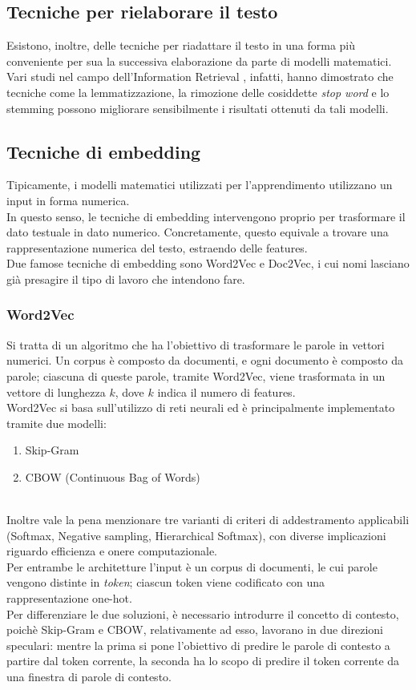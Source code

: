\documentclass[12pt]{report}
\theoremstyle{definition}
\begin{document}
\subsection{Tecniche per rielaborare il testo}
Esistono, inoltre, delle tecniche per riadattare il testo in una forma più conveniente per sua la successiva elaborazione da parte di modelli matematici.
\\
Vari studi nel campo dell'Information Retrieval \cite{22}, infatti, hanno dimostrato che tecniche come la lemmatizzazione, la rimozione delle cosiddette \textit{stop word} e lo stemming possono migliorare sensibilmente i risultati ottenuti da tali modelli.

\subsection{Tecniche di embedding} \label{embedding}
Tipicamente, i modelli matematici utilizzati per l'apprendimento utilizzano un input in forma numerica.
\\
In questo senso, le tecniche di embedding intervengono proprio per trasformare il dato testuale in dato numerico.
Concretamente, questo equivale a trovare una rappresentazione numerica del testo, estraendo delle features.
\\
Due famose tecniche di embedding sono Word2Vec e Doc2Vec, i cui nomi lasciano già presagire il tipo di lavoro che intendono fare.
\subsubsection{Word2Vec} \label{w2v}
Si tratta di un algoritmo che ha l'obiettivo di trasformare le parole in vettori numerici.
Un corpus è composto da documenti, e ogni documento è composto da parole; ciascuna di queste parole, tramite Word2Vec, viene trasformata in un vettore di lunghezza $k$, dove $k$ indica il numero di features. 
\\
Word2Vec si basa sull'utilizzo di reti neurali \cite{3} ed è principalmente implementato tramite due modelli:
\begin{enumerate}
    \item Skip-Gram
    \item CBOW (Continuous Bag of Words)
\end{enumerate}
\\
Inoltre vale la pena menzionare tre varianti di criteri di addestramento applicabili (Softmax, Negative sampling, Hierarchical Softmax), con diverse implicazioni riguardo efficienza e onere computazionale.
\\
Per entrambe le architetture l'input è un corpus di documenti, le cui parole vengono distinte in \textit{token}; ciascun token viene codificato con una rappresentazione one-hot.
\\
Per differenziare le due soluzioni, è necessario introdurre il concetto di contesto, poichè Skip-Gram e CBOW, relativamente ad esso, lavorano in due direzioni speculari:
mentre la prima si pone l'obiettivo di predire le parole di contesto a partire dal token corrente, la seconda ha lo scopo di predire il token corrente da una finestra di parole di contesto.
\end{document}

